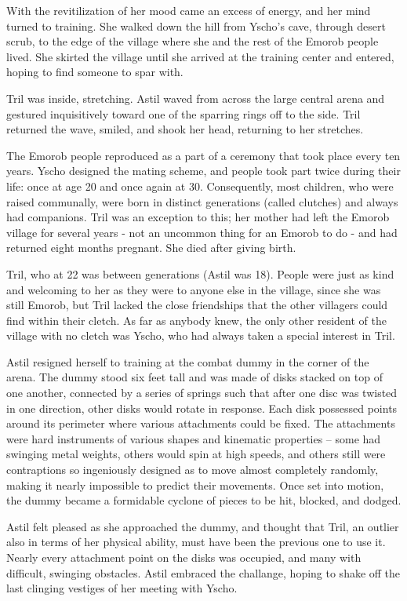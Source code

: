 \documentclass[12pt]{book}
\begin{document}
With the revitilization of her mood came an excess of energy, and her mind turned to training.  She walked down the hill from Yscho's cave, through desert scrub, to the edge of the  village where she and the rest of the Emorob people lived.  She skirted the village until she arrived at the training center and entered, hoping to find someone to spar with. 

Tril was inside, stretching.  Astil waved from across the large central arena and gestured inquisitively toward one of the sparring rings off to the side.  Tril returned the wave, smiled, and shook her head, returning to her stretches.  

The Emorob people reproduced as a part of a ceremony that took place every ten years.  Yscho designed the mating scheme, and people took part twice during their life: once at age 20 and once again at 30.  Consequently, most children, who were raised communally, were born in distinct generations (called clutches) and always had companions.  Tril was an exception to this; her mother had left the Emorob village for several years - not an uncommon thing for an Emorob to do - and had returned eight months pregnant.  She died after giving birth.

Tril, who at 22 was between generations (Astil was 18).  People were just as kind and welcoming to her as they were to anyone else in the village, since she was still Emorob, but Tril lacked the close friendships that the other villagers could find within their cletch.  As far as anybody knew, the only other resident of the village with no cletch was Yscho, who had always taken a special interest in Tril.

Astil resigned herself to training at the combat dummy in the corner of the arena.  The dummy stood six feet tall and was made of disks stacked on top of one another, connected by a series of springs such that after one disc was twisted in one direction, other disks would rotate in response.  Each disk possessed points around its perimeter where various attachments could be fixed.  The attachments were hard instruments of various shapes and kinematic properties -- some had swinging metal weights, others would spin at high speeds, and others still were contraptions so ingeniously designed as to move almost completely randomly, making it nearly impossible to predict their movements.  Once set into motion, the dummy became a formidable cyclone of pieces to be hit, blocked, and dodged.

Astil felt pleased as she approached the dummy, and thought that Tril, an outlier also in terms of her physical ability, must have been the previous one to use it.  Nearly every attachment point on the disks was occupied, and many with difficult, swinging obstacles.  Astil embraced the challange, hoping to shake off the last clinging vestiges of her meeting with Yscho.
\end{document}
